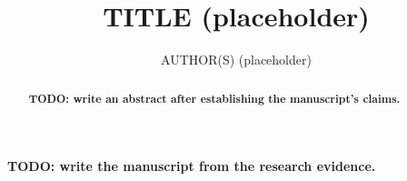 \documentclass[aps,prd,preprint,12pt]{revtex4-2}
\begin{document}
\title{TITLE (placeholder)}
\author{AUTHOR(S) (placeholder)}
\date{}

\begin{abstract}
\textbf{TODO: write an abstract after establishing the manuscript's claims.}
\end{abstract}
\maketitle

\textbf{TODO: write the manuscript from the research evidence.}



\end{document}
